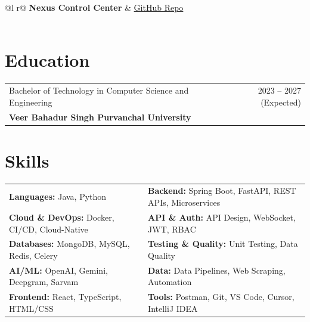 \documentclass[a4paper,10pt]{article}
\begin{document}
\begin{tabularx}{\linewidth}{ @{}l r@{} }
\textbf{Nexus Control Center} & \hfill \href{https://github.com/Abhiboss07/Nexus}{GitHub Repo} \\[2pt]
  \\
\end{tabularx}

\section{Education}
\begin{tabularx}{\linewidth}{ @{}l r@{} }
Bachelor of Technology in Computer Science and Engineering & \hfill 2023 -- 2027 (Expected) \\[2pt]
\textbf{Veer Bahadur Singh Purvanchal University} &
\end{tabularx}

\section{Skills}
\begin{tabularx}{\linewidth}{@{}X X@{}}
\textbf{Languages:} Java, Python & \textbf{Backend:} Spring Boot, FastAPI, REST APIs, Microservices \\[2pt]
\textbf{Cloud \& DevOps:} Docker, CI/CD, Cloud-Native & \textbf{API \& Auth:} API Design, WebSocket, JWT, RBAC \\[2pt]
\textbf{Databases:} MongoDB, MySQL, Redis, Celery & \textbf{Testing \& Quality:} Unit Testing, Data Quality \\[2pt]
\textbf{AI/ML:} OpenAI, Gemini, Deepgram, Sarvam & \textbf{Data:} Data Pipelines, Web Scraping, Automation \\[2pt]
\textbf{Frontend:} React, TypeScript, HTML/CSS & \textbf{Tools:} Postman, Git, VS Code, Cursor, IntelliJ IDEA
\end{tabularx}
\end{document}
